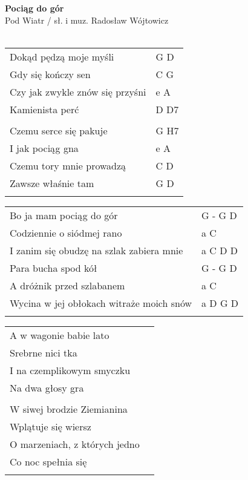 \documentclass[a5paper]{article}
\begin{document}


\noindent
\fontsize{12pt}{15pt}\selectfont
\textbf{Pociąg do gór} \\
\fontsize{8pt}{10pt}\selectfont
Pod Wiatr / sł. i muz. Radosław Wójtowicz\\ \\
\fontsize{10pt}{12pt}\selectfont
{}
\begin{tabular}{@{}p{8.50cm}p{3cm}@{}}
\noindent
Dokąd pędzą moje myśli & G D \\
Gdy się kończy sen & C G \\
Czy jak zwykle znów się przyśni & e A \\
Kamienista perć & D D7  \\ \\

Czemu serce się pakuje & G H7 \\
I jak pociąg gna & e A \\
Czemu tory mnie prowadzą & C D \\
Zawsze właśnie tam & G D \\ \\
\end{tabular}

\noindent
\begin{tabular}{@{}p{7.50cm}p{3cm}@{}}
Bo ja mam pociąg do gór & G - G D \\
Codziennie o siódmej rano & a C \\
I zanim się obudzę na szlak zabiera mnie & a C D D \\
 
Para bucha spod kół & G - G D \\
A dróżnik przed szlabanem & a C \\
Wycina w jej obłokach witraże moich snów & a D G D \\ \\
\end{tabular}

\noindent
\begin{tabular}{@{}p{7.50cm}p{3cm}@{}}
A w wagonie babie lato \\
Srebrne nici tka \\
I na czemplikowym smyczku \\
Na dwa głosy gra \\ \\
 
W siwej brodzie Ziemianina \\
Wplątuje się wiersz \\
O marzeniach, z których jedno \\
Co noc spełnia się \\ \\
\end{tabular}
\end{document}

